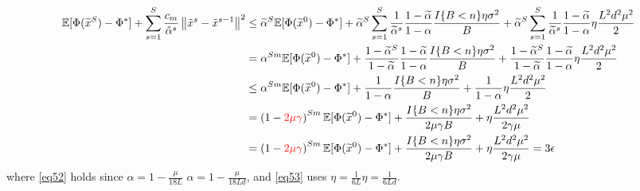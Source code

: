 \documentclass{article}
\newcommand*{\E}{\mathbb{E}}
\newcommand{\norm}[1]{\left\lVert#1\right\rVert}
\theoremstyle{definition}
\theoremstyle{remark}
\begin{document}
{{\color{blue}
\begin{align}
\E[\Phi(\widetilde{x}^S) - {\Phi}^*]+ \sum_{s=1}^S\frac{c_m}{\tilde{\alpha}^s}\norm{\tilde{x}^{s} - \tilde{x}^{s-1}}^2 & \leq \widetilde{\alpha}^{S} \E[\Phi(\widetilde{x}^0) - {\Phi}^*] + \widetilde{\alpha}^{S} \sum_{s=1}^S \frac{1}{\widetilde{\alpha}^s}\frac{1-\widetilde{\alpha}}{1-{\alpha}}\frac{I\{B < n\}\eta \sigma ^2}{B} + \widetilde{\alpha}^{S} \sum_{s=1}^S \frac{1}{\widetilde{\alpha}^s}\frac{1-\widetilde{\alpha}}{1-{\alpha}}\eta \frac{L^2 d^2 \mu^2}{2}\notag\\
& = {\alpha}^{Sm} \E[\Phi(\widetilde{x}^0) - {\Phi}^*] + \frac{1-\widetilde{\alpha}^S}{1-\widetilde{\alpha}}\frac{1-\widetilde{\alpha}}{1-{\alpha}}\frac{I\{B < n\}\eta \sigma ^2}{B}+ \frac{1-\widetilde{\alpha}^S}{1-\widetilde{\alpha}}\frac{1-\widetilde{\alpha}}{1-{\alpha}}\eta \frac{L^2 d^2 \mu^2}{2}\notag\\
& \leq {\alpha}^{Sm} \E[\Phi(\widetilde{x}^0) - {\Phi}^*] + \frac{1}{1-{\alpha}}\frac{I\{B < n\}\eta \sigma ^2}{B}+ \frac{1}{1-{\alpha}}\eta \frac{L^2 d^2 \mu^2}{2}\notag\\
& = \left(1-{\color{red}{2\mu}{\gamma}}\right)^{Sm} \E[\Phi(\widetilde{x}^0) - {\Phi}^*] + \frac{I\{B < n\}\eta \sigma ^2}{2\mu\gamma B}+ \eta \frac{L^2 d^2 \mu^2}{2\gamma\mu}\label{eq52}\\
& = \left(1-{\color{red}{2\mu}{\gamma}}\right)^{Sm} \E[\Phi(\widetilde{x}^0) - {\Phi}^*] + \frac{I\{B < n\}\eta \sigma ^2}{2\mu\gamma B} + \eta \frac{L^2 d^2 \mu^2}{2\gamma\mu}= 3 \epsilon\label{eq53}
\end{align}
}
where \eqref{eq52} holds since $\alpha = 1-\frac{\mu}{18L}$ {\color{blue}$\alpha = 1-\frac{\mu}{18Ld}$}, and \eqref{eq53} uses $\eta = \frac{1}{6L}${\color{blue}$\eta = \frac{1}{6Ld}$}.
 
 }
\end{document}
